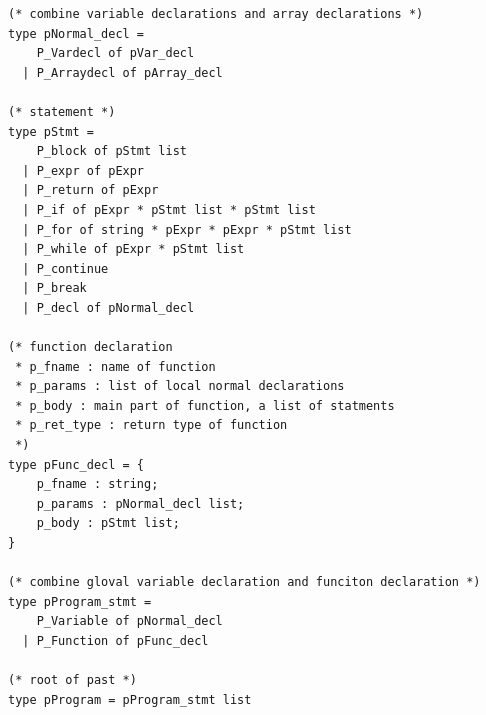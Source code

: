 \documentclass[12pt]{article} %
\begin{document}
\begin{lstlisting}[style=appendix, caption=past.ml]
(* combine variable declarations and array declarations *)
type pNormal_decl = 
    P_Vardecl of pVar_decl
  | P_Arraydecl of pArray_decl

(* statement *)
type pStmt =
    P_block of pStmt list
  | P_expr of pExpr
  | P_return of pExpr
  | P_if of pExpr * pStmt list * pStmt list
  | P_for of string * pExpr * pExpr * pStmt list
  | P_while of pExpr * pStmt list
  | P_continue
  | P_break
  | P_decl of pNormal_decl

(* function declaration 
 * p_fname : name of function
 * p_params : list of local normal declarations
 * p_body : main part of function, a list of statments
 * p_ret_type : return type of function
 *)
type pFunc_decl = {
    p_fname : string;
    p_params : pNormal_decl list;
    p_body : pStmt list;
}

(* combine gloval variable declaration and funciton declaration *)
type pProgram_stmt =
    P_Variable of pNormal_decl
  | P_Function of pFunc_decl

(* root of past *)
type pProgram = pProgram_stmt list
\end{lstlisting}
\end{document}
